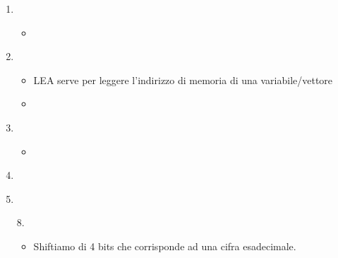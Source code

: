 \documentclass[a4paper, 12pt]{article} %
\begin{document}
\begin{enumerate}
	\item {} \\
	\begin{itemize}
		\item {}
	\end{itemize}
	\item {} \\
	\begin{itemize}
		\item \textsf{{\small LEA serve per leggere l'indirizzo di memoria di una variabile/vettore}} \\
		\item {} \\
	\end{itemize}
	\item {} \\
	\enlargethispage{12pt}
	\begin{itemize}
		\item {} \\
	\end{itemize}
	\pagebreak
	\item {} \\
	\item {} \\
	\item[8.]  \\
	\begin{itemize}
		\item \textsf{{\small Shiftiamo di 4 bits che corrisponde ad una cifra esadecimale.}} \\
		\begin{comment}
			\begin{tikzpicture}[
				node distance=0pt,
				start chain = A going right,
				X/.style = {rectangle, draw,%
					minimum width=2ex, minimum height=3ex,
					outer sep=0pt, on chain},
				B/.style = {decorate,
					decoration={brace, amplitude=5pt,
						pre=moveto,pre length=1pt,post=moveto,post length=1pt,
						raise=1mm,
						#1}, %
					thick},
				B/.default=mirror, %
				]
				\foreach \i in {0,1,1,0,0,0,1,0,0,
					0,1,0,1,0,0,0,1,0,
					0,0,1,1,0,0,1,0,0}%
				\node[X] {\i};
				\draw[B] ( A-1.south west) -- node[below=2mm] {Channel 1 Links} ( A-9.south east);
				\draw[B] (A-10.south west) -- node[below=2mm] {Channel 2 Links} (A-18.south east);
				\draw[B] (A-19.south west) -- node[below=2mm] {Channel 3 Links} (A-27.south east);
				\node (B1) [inner sep=1pt,above=of A-10.north west] {$\times$};
				\node (B2) [inner sep=1pt,above=of A-19.north west] {$\times$};
				\draw[B=](B1.north) -- node[above=2mm] {Crossover Points}(B2.north);
			\end{tikzpicture}
	\end{comment}
	

\end{itemize}
\end{enumerate}
\end{document}
